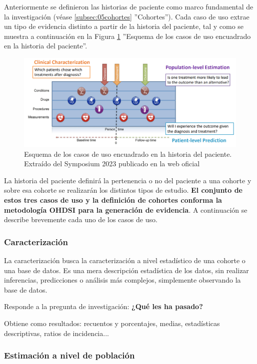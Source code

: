 Anteriormente se definieron las historias de paciente como marco fundamental de la investigación (véase \ref{subsec:05cohortes} ''Cohortes''). Cada caso de uso extrae un tipo de evidencia distinto a partir de la historia del paciente, tal y como se muestra a continuación en la Figura \ref{fig:useCasesJourney} ''Esquema de los casos de uso encuadrado en la historia del paciente''.


\begin{figure}[H]
\centering
\includegraphics[width=1\textwidth]{figures/useCasesJourney.png}
     \caption{Esquema de los casos de uso encuadrado en la historia del paciente. Extraído del Symposium 2023 publicado en la web oficial \parencite{OHDSIwebsite}}
    \label{fig:useCasesJourney}
\end{figure}

La historia del paciente definirá la pertenencia o no del paciente a una cohorte y sobre esa cohorte se realizarán los distintos tipos de estudio. \textbf{El conjunto de estos tres casos de uso y la definición de cohortes conforma la metodología OHDSI para la generación de evidencia}. A continuación se describe brevemente cada uno de los casos de uso. 

\subsubsection{Caracterización}

La caracterización busca la caracterización a nivel estadístico de una cohorte o una base de datos. Es una mera descripción estadística de los datos, sin realizar inferencias, predicciones o análisis más complejos, simplemente observando la base de datos.

Responde a la pregunta de investigación: \textbf{¿Qué les ha pasado?}

Obtiene como resultados: recuentos y porcentajes, medias, estadísticas descriptivas, ratios de incidencia...

\subsubsection{Estimación a nivel de población}

